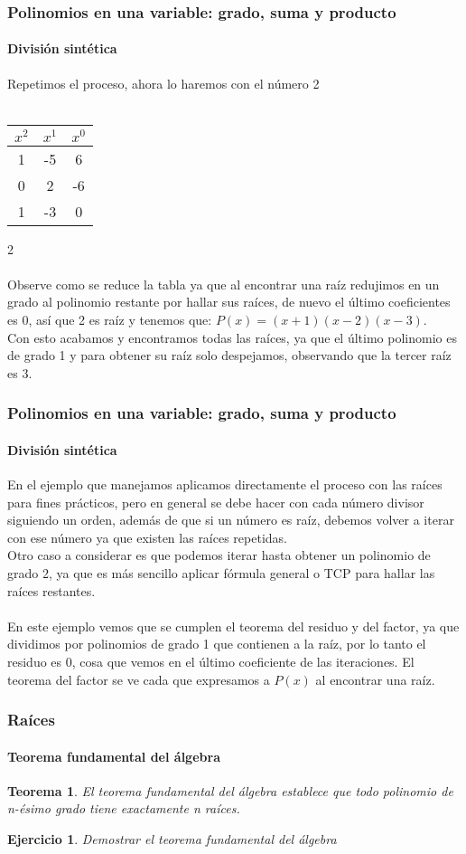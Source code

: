 \documentclass[11pt]{beamer}
\newtheorem{eje}{Ejercicio}
\newtheorem{teor}{Teorema}
\begin{document}
\begin{frame}
\frametitle{Polinomios en una variable: grado, suma y producto}
\framesubtitle{División sintética}
Repetimos el proceso, ahora lo haremos con el número 2 \\ \hspace{0cm} \\
\begin{tabular}{c|c|c|}
$x^2$ & $x^1$ & $x^0$\\ \hline
1 & -5 & 6 \\ 
0 & 2 & -6\\ \hline
1 & -3 & 0
\end{tabular}
2\\ \hspace{0cm} \\
Observe como se reduce la tabla ya que al encontrar una raíz redujimos en un grado al polinomio restante por hallar sus raíces, de nuevo el último coeficientes es 0, así que 2 es raíz y tenemos que: $P(x) = (x+1)(x-2)(x-3)$.\\
Con esto acabamos y encontramos todas las raíces, ya que el último polinomio es de grado 1 y para obtener su raíz solo despejamos, observando que la tercer raíz es 3.
\end{frame}

\begin{frame}
\frametitle{Polinomios en una variable: grado, suma y producto}
\framesubtitle{División sintética}
En el ejemplo que manejamos aplicamos directamente el proceso con las raíces para fines prácticos, pero en general se debe hacer con cada número divisor siguiendo un orden, además de que si un número es raíz, debemos volver a iterar con ese número ya que existen las raíces repetidas.\\
Otro caso a considerar es que podemos iterar hasta obtener un polinomio de grado 2, ya que es más sencillo aplicar fórmula general o TCP para hallar las raíces restantes.\\ \hspace{0cm} \\
En este ejemplo vemos que se cumplen el teorema del residuo y del factor, ya que dividimos por polinomios de grado 1 que contienen a la raíz, por lo tanto el residuo es 0, cosa que vemos en el último coeficiente de las iteraciones. El teorema del factor se ve cada que expresamos a $P(x)$ al encontrar una raíz.
\end{frame}

\begin{frame}
\frametitle{Raíces}
\framesubtitle{Teorema fundamental del álgebra}
\begin{teor}
El teorema fundamental del álgebra establece que todo polinomio de n-ésimo grado tiene exactamente n raíces.
\end{teor}
\begin{eje}
Demostrar el teorema fundamental del álgebra
\end{eje}
\end{frame}
\end{document}
